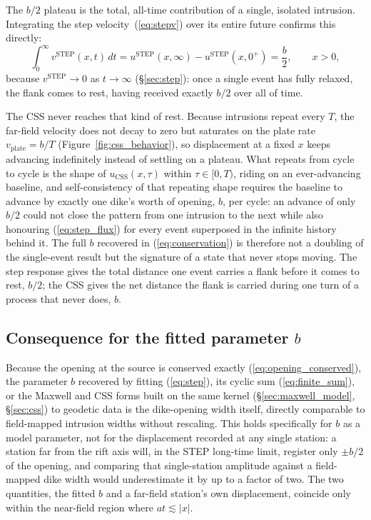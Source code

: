 \documentclass[extra]{gji}
\begin{document}
The $b/2$ plateau is the total, all-time contribution of a single, isolated
intrusion. Integrating the step velocity~(\ref{eq:stepv}) over its entire
future confirms this directly:
\begin{equation}
\int_0^{\infty}v^{\text{STEP}}(x,t)\,dt
= u^{\text{STEP}}(x,\infty)-u^{\text{STEP}}(x,0^+) = \frac{b}{2},
\qquad x>0,
\label{eq:step_flux}
\end{equation}
because $v^{\text{STEP}}\to0$ as $t\to\infty$ (\S\ref{sec:step}): once a
single event has fully relaxed, the flank comes to rest, having received
exactly $b/2$ over all of time.

The CSS never reaches that kind of rest. Because intrusions repeat every
$T$, the far-field velocity does not decay to zero but saturates on the
plate rate $v_{\text{plate}}=b/T$ (Figure~\ref{fig:css_behavior}), so
displacement at a fixed $x$ keeps advancing indefinitely instead of
settling on a plateau. What repeats from cycle to cycle is the shape of
$u_{\text{CSS}}(x,\tau)$ within $\tau\in[0,T)$, riding on an
ever-advancing baseline, and self-consistency of that repeating shape
requires the baseline to advance by exactly one dike's worth of opening,
$b$, per cycle: an advance of only $b/2$ could not close the pattern from
one intrusion to the next while also honouring (\ref{eq:step_flux}) for
every event superposed in the infinite history behind it. The full $b$
recovered in (\ref{eq:conservation}) is therefore not a doubling of the
single-event result but the signature of a state that never stops moving.
The step response gives the total distance one event carries a flank
before it comes to rest, $b/2$; the CSS gives the net distance the flank
is carried during one turn of a process that never does, $b$.

\subsection{Consequence for the fitted parameter \texorpdfstring{$b$}{b}}

Because the opening at the source is conserved exactly
(\ref{eq:opening_conserved}), the parameter $b$ recovered by fitting
(\ref{eq:step}), its cyclic sum (\ref{eq:finite_sum}), or the Maxwell and CSS
forms built on the same kernel (\S\ref{sec:maxwell_model}, \S\ref{sec:css}) to
geodetic data is the dike-opening width itself, directly comparable to
field-mapped intrusion widths without rescaling. This holds specifically for
$b$ as a model parameter, not for the displacement recorded at any single
station: a station far from the rift axis will, in the STEP long-time
limit, register only $\pm b/2$ of the opening, and comparing that
single-station amplitude against a field-mapped dike width would
underestimate it by up to a factor of two. The two quantities, the fitted
$b$ and a far-field station's own displacement, coincide only within the
near-field region where $at\lesssim|x|$.
\end{document}
